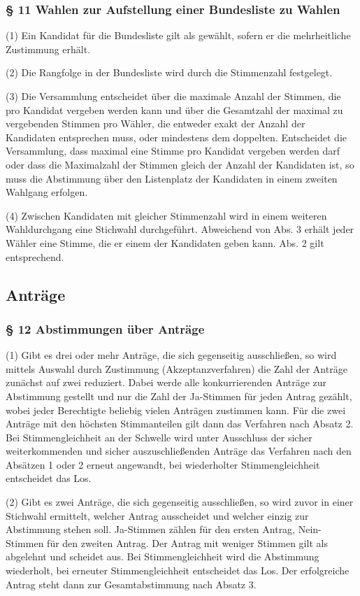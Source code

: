 \subsubsection{§ 11 Wahlen zur Aufstellung einer Bundesliste zu Wahlen}

(1) Ein Kandidat für die Bundesliste gilt als gewählt, sofern er die
mehrheitliche Zustimmung erhält.

(2) Die Rangfolge in der Bundesliste wird durch die Stimmenzahl
festgelegt.

(3) Die Versammlung entscheidet über die maximale Anzahl der Stimmen,
die pro Kandidat vergeben werden kann und über die Gesamtzahl der
maximal zu vergebenden Stimmen pro Wähler, die entweder exakt der Anzahl
der Kandidaten entsprechen muss, oder mindestens dem doppelten.
Entscheidet die Versammlung, dass maximal eine Stimme pro Kandidat
vergeben werden darf oder dass die Maximalzahl der Stimmen gleich der
Anzahl der Kandidaten ist, so muss die Abstimmung über den Listenplatz
der Kandidaten in einem zweiten Wahlgang erfolgen.

(4) Zwischen Kandidaten mit gleicher Stimmenzahl wird in einem weiteren
Wahldurchgang eine Stichwahl durchgeführt. Abweichend von Abs. 3 erhält
jeder Wähler eine Stimme, die er einem der Kandidaten geben kann. Abs. 2
gilt entsprechend.

\subsection{Anträge}

\subsubsection{§ 12 Abstimmungen über Anträge}

(1) Gibt es drei oder mehr Anträge, die sich gegenseitig ausschließen,
so wird mittels Auswahl durch Zustimmung (Akzeptanzverfahren) die Zahl
der Anträge zunächst auf zwei reduziert. Dabei werde alle
konkurrierenden Anträge zur Abstimmung gestellt und nur die Zahl der
Ja-Stimmen für jeden Antrag gezählt, wobei jeder Berechtigte beliebig
vielen Anträgen zustimmen kann. Für die zwei Anträge mit den höchsten
Stimmanteilen gilt dann das Verfahren nach Absatz 2. Bei
Stimmengleichheit an der Schwelle wird unter Ausschluss der sicher
weiterkommenden und sicher auszuschließenden Anträge das Verfahren nach
den Absätzen 1 oder 2 erneut angewandt, bei wiederholter
Stimmengleichheit entscheidet das Los.

(2) Gibt es zwei Anträge, die sich gegenseitig ausschließen, so wird
zuvor in einer Stichwahl ermittelt, welcher Antrag ausscheidet und
welcher einzig zur Abstimmung stehen soll. Ja-Stimmen zählen für den
ersten Antrag, Nein-Stimmen für den zweiten Antrag. Der Antrag mit
weniger Stimmen gilt als abgelehnt und scheidet aus. Bei
Stimmengleichheit wird die Abstimmung wiederholt, bei erneuter
Stimmengleichheit entscheidet das Los. Der erfolgreiche Antrag steht
dann zur Gesamtabstimmung nach Absatz 3.

